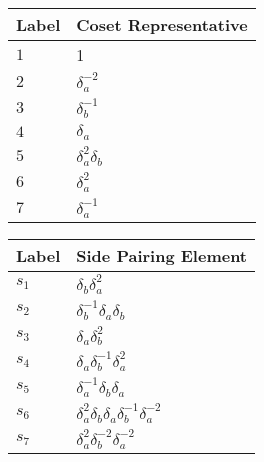 \documentclass{article}
\begin{document}

\begin{center}
\begin{tabular}{ll}
\toprule
Label & Coset Representative\\
\midrule
$1$ & 1 \\
$2$ & $\delta_a^{-2}$ \\
$3$ & $\delta_b^{-1}$ \\
$4$ & $\delta_a^{}$ \\
$5$ & $\delta_a^{2}\delta_b^{}$ \\
$6$ & $\delta_a^{2}$ \\
$7$ & $\delta_a^{-1}$ \\
\bottomrule
\end{tabular}
\hfill
\begin{tabular}{ll}
\toprule
Label & Side Pairing Element\\
\midrule
$s_{1}$ & $\delta_b^{}\delta_a^{2}$ \\
$s_{2}$ & $\delta_b^{-1}\delta_a^{}\delta_b^{}$ \\
$s_{3}$ & $\delta_a^{}\delta_b^{2}$ \\
$s_{4}$ & $\delta_a^{}\delta_b^{-1}\delta_a^{2}$ \\
$s_{5}$ & $\delta_a^{-1}\delta_b^{}\delta_a^{}$ \\
$s_{6}$ & $\delta_a^{2}\delta_b^{}\delta_a^{}\delta_b^{-1}\delta_a^{-2}$ \\
$s_{7}$ & $\delta_a^{2}\delta_b^{-2}\delta_a^{-2}$ \\
\bottomrule
\end{tabular}
\end{center}

\thispagestyle{empty}
\end{document}
